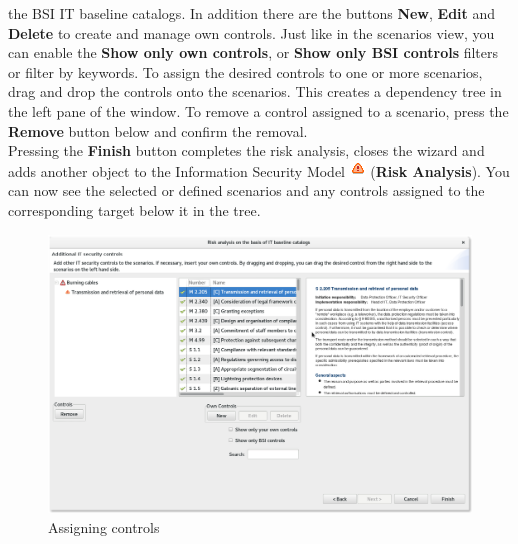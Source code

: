 \documentclass[a4paper,10pt]{book}
\begin{document}
the BSI IT baseline catalogs. In addition there are the buttons \textbf{New}, \textbf{Edit} and \textbf{Delete} to create and manage own controls. Just like in the scenarios view, you can enable the \textbf{Show only own controls}, or
\textbf{Show only BSI controls} filters or filter by keywords. To assign the desired controls to one or more scenarios, drag and drop the controls onto the scenarios. This creates a dependency
tree in the left pane of the window. To remove a control assigned to a scenario, press the \textbf{Remove}
button below and confirm the removal.
\newline\\
Pressing the \textbf{Finish} button completes the risk analysis, closes the wizard and adds another
object to the Information Security Model \includegraphics[height=2ex]{Icon/Risikoanalyse.png}
(\textbf{Risk Analysis}). You can now see the selected or defined scenarios
and any controls assigned to the corresponding target below it in the tree.
\begin{figure}[htb!]
  \centering
  \includegraphics[scale=.35]{Screenshot/Massnahmenzuordnung-en.png}
  \caption{\label{Assigning controls} Assigning controls}
\end{figure}
\end{document}
